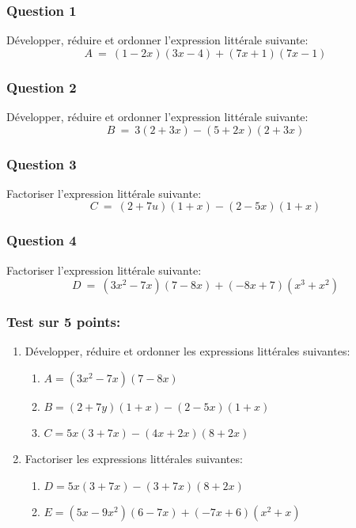 \documentclass[t,12pt]{beamer}
\begin{document}
\begin{frame}
	\frametitle{Question 1}
Développer, réduire et ordonner l'expression littérale suivante:
$$A \ = \ (1-2x)(3x-4)+(7x+1)(7x-1)$$
\end{frame}

\begin{frame}
\frametitle{Question 2}
Développer, réduire et ordonner l'expression littérale suivante:
$$B \ = \ 3(2 + 3x) - (5 + 2x)(2 + 3x)$$
\end{frame}

\begin{frame}
	\frametitle{Question 3}
	Factoriser l'expression littérale suivante:
	$$C \ = \ (2 + 7u)(1 + x) - (2 - 5x)(1 + x) $$
\end{frame}

\begin{frame}
	\frametitle{Question 4}
	Factoriser l'expression littérale suivante:
	$$D \ = \ (3x^2 - 7x)(7 - 8x) + ( - 8x + 7)(x^3 + x^2)$$
\end{frame}

\begin{frame}

\end{frame}

\begin{frame}
	\frametitle{Test sur 5 points:}
\begin{enumerate}
	\item Développer, réduire et ordonner les expressions littérales suivantes:\\
	\begin{enumerate}
		\item $A = (3x^2 - 7x)(7 - 8x)$ \\ 
		\item $B =  (2 + 7y)(1 + x) - (2 - 5x)(1 + x) $\\
		\item $C = 5x(3 + 7x) - (4x + 2x)(8 + 2x)$
	\end{enumerate}\bigskip 

	\item Factoriser les expressions littérales suivantes:\\
	\begin{enumerate}
		\item $D = 5x(3 + 7x) - (3 + 7x)(8 + 2x)$\\
		\item $E = (5x - 9x^2)(6 - 7x) + ( - 7x + 6)(x^2 + x)$
	\end{enumerate}
\end{enumerate}
\end{frame}
\end{document}
